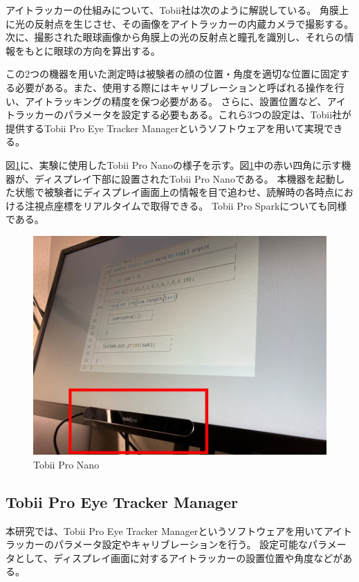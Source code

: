 \documentclass[paper=a4paper,fontsize=11pt]{jlreq}
\begin{document}
    アイトラッカーの仕組みについて、Tobii社は次のように解説している\cite{itracking_sikumi}。
    角膜上に光の反射点を生じさせ、その画像をアイトラッカーの内蔵カメラで撮影する。次に、撮影された眼球画像から角膜上の光の反射点と瞳孔を識別し、それらの情報をもとに眼球の方向を算出する。
    
    この2つの機器を用いた測定時は被験者の顔の位置・角度を適切な位置に固定する必要がある。また、使用する際にはキャリブレーションと呼ばれる操作を行い、アイトラッキングの精度を保つ必要がある。
    さらに、設置位置など、アイトラッカーのパラメータを設定する必要もある。これら3つの設定は、Tobii社が提供するTobii Pro Eye Tracker Manager\cite{manager}というソフトウェアを用いて実現できる。

    図\ref{tobii_nano}に、実験に使用したTobii Pro Nanoの様子を示す。図\ref{tobii_nano}中の赤い四角に示す機器が、ディスプレイ下部に設置されたTobii Pro Nanoである。
    本機器を起動した状態で被験者にディスプレイ画面上の情報を目で追わせ、読解時の各時点における注視点座標をリアルタイムで取得できる。
    Tobii Pro Sparkについても同様である。
    \begin{figure}[htbp]
      \centering
      \includegraphics[width=0.8\linewidth]{tobii_nano.jpg}
      \caption{Tobii Pro Nano}
      \label{tobii_nano}
    \end{figure}
    \FloatBarrier
    \clearpage

    \subsection{Tobii Pro Eye Tracker Manager}
      本研究では、Tobii Pro Eye Tracker Manager\cite{manager}というソフトウェアを用いてアイトラッカーのパラメータ設定やキャリブレーションを行う。
      設定可能なパラメータとして、ディスプレイ画面に対するアイトラッカーの設置位置や角度などがある。
\end{document}
